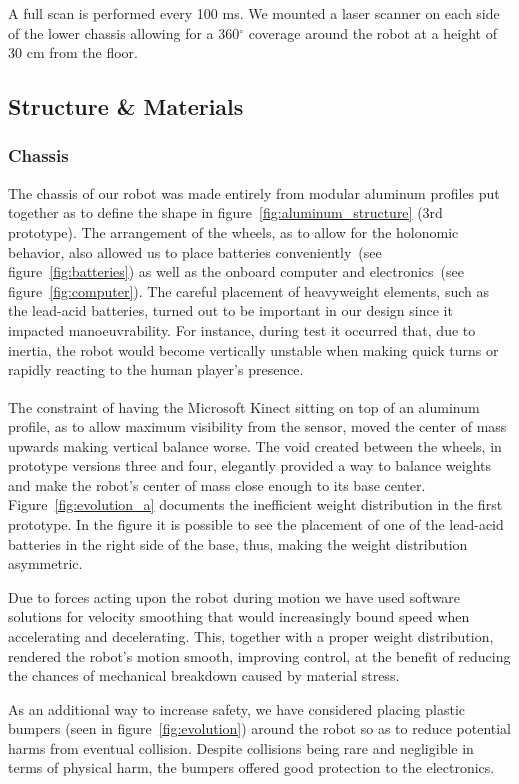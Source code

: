 A full scan is performed every 100 ms. We mounted a laser scanner on each side of the lower chassis allowing for a 360$^\circ$ coverage around the robot at a height of 30 cm from the floor.

\subsection{Structure \& Materials}
\subsubsection{Chassis}
The chassis of our robot was made entirely from modular aluminum profiles put together as to define the shape in figure~\ref{fig:aluminum_structure} (3rd prototype). The arrangement of the wheels, as to allow for the holonomic behavior, also allowed us to place batteries conveniently~(see figure~\ref{fig:batteries}) as well as the onboard computer and electronics~(see figure~\ref{fig:computer}). The careful placement of heavyweight elements, such as the lead-acid batteries, turned out to be important in our design since it impacted manoeuvrability. For instance, during test it occurred that, due to inertia, the robot would become vertically unstable when making quick turns or rapidly reacting to the human player's presence. 

The constraint of having the Microsoft Kinect\textsuperscript{\textregistered} sitting on top of an aluminum profile, as to allow maximum visibility from the sensor, moved the center of mass upwards making vertical balance worse. The void created between the wheels, in prototype versions three and four, elegantly provided a way to balance weights and make the robot's center of mass close enough to its base center. Figure~\ref{fig:evolution_a} documents the inefficient weight distribution in the first prototype. In the figure it is possible to see the placement of one of the lead-acid batteries in the right side of the base, thus, making the weight distribution asymmetric.

Due to forces acting upon the robot during motion we have used software solutions for velocity smoothing that would increasingly bound speed when accelerating and decelerating. This, together with a proper weight distribution, rendered the robot's motion smooth, improving control, at the benefit of reducing the chances of mechanical breakdown caused by material stress.

As an additional way to increase safety, we have considered placing plastic bumpers (seen in figure~\ref{fig:evolution}) around the robot so as to reduce potential harms from eventual collision. Despite collisions being rare and negligible in terms of physical harm, the bumpers offered good protection to the electronics.

